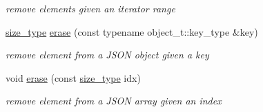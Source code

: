 \begin{DoxyCompactItemize}
\begin{DoxyCompactList}\small\item\em remove elements given an iterator range \end{DoxyCompactList}\item 
\hyperlink{classnlohmann_1_1basic__json_a3ada29bca70b4965f6fd37ec1c8f85f7}{size\+\_\+type} \hyperlink{classnlohmann_1_1basic__json_af72b1c9d1502b02a49a0cb9db9f980ea}{erase} (const typename object\+\_\+t\+::key\+\_\+type \&key)
\begin{DoxyCompactList}\small\item\em remove element from a J\+S\+ON object given a key \end{DoxyCompactList}\item 
void \hyperlink{classnlohmann_1_1basic__json_a221b943d3228488c14225e55f726cc26}{erase} (const \hyperlink{classnlohmann_1_1basic__json_a3ada29bca70b4965f6fd37ec1c8f85f7}{size\+\_\+type} idx)
\begin{DoxyCompactList}\small\item\em remove element from a J\+S\+ON array given an index \end{DoxyCompactList}\end{DoxyCompactItemize}
